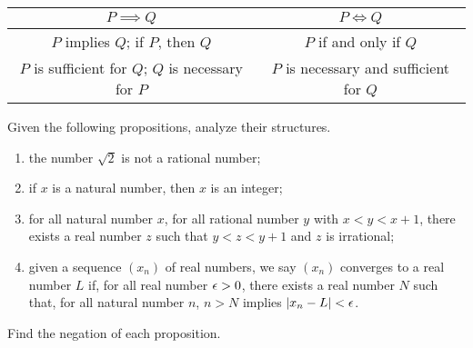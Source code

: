 \documentclass[10pt]{article}
\begin{document}
\begin{center}
    \begin{tabular}{c|c}
        $P\implies Q$ & $P\iff Q$ \\
        \hline
        $P$ implies $Q$; if $P$, then $Q$ & $P$ if and only if $Q$ \\
        $P$ is sufficient for $Q$; $Q$ is necessary for $P$ & $P$ is necessary and sufficient for $Q$
    \end{tabular}
\end{center}
\begin{problem}
    Given the following propositions, analyze their structures.
    \begin{enumerate}
        \item the number $\sqrt{2}$ is not a rational number;
        \item if $x$ is a natural number, then $x$ is an integer;
        \item for all natural number $x$, for all rational number $y$ with $x<y<x+1$, there exists a real number $z$ such that $y<z<y+1$ and $z$ is irrational;
        \item given a sequence $({x}_{n})$ of real numbers, we say $({x}_{n})$ converges to a real number $L$ if, for all real number $\epsilon>0$, there exists a real number $N$ such that, for all natural number $n$, $n>N$ implies $\lvert{{x}_{n}-L}\rvert<\epsilon$.
    \end{enumerate} 
    Find the negation of each proposition. 
\end{problem}
\end{document}
